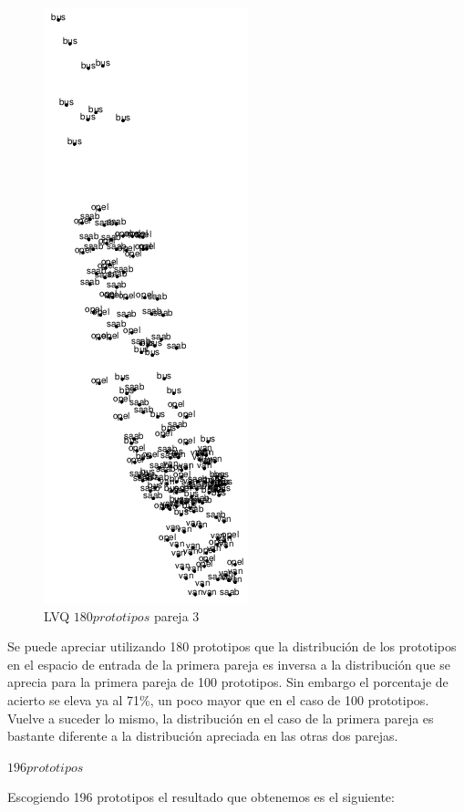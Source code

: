 \documentclass[11pt,spanish,listoffigures,listoftables]{workluis}
\begin{document}
\begin{figure}[H]
\centering
\includegraphics[scale=0.5]{lvq180p3}
\caption{LVQ $180 prototipos$ pareja 3}
\end{figure} 

\par Se puede apreciar utilizando 180 prototipos que la distribución de los prototipos en el espacio de entrada de la primera pareja es inversa a la distribución que se aprecia para la primera pareja de 100 prototipos. Sin embargo el porcentaje de acierto se eleva ya al 71\%, un poco mayor que en el caso de 100 prototipos. Vuelve a suceder lo mismo, la distribución en el caso de la primera pareja es bastante diferente a la distribución apreciada en las otras dos parejas.


\par \textbf{$196 prototipos$}

\par Escogiendo 196 prototipos el resultado que obtenemos es el siguiente:
\end{document}
